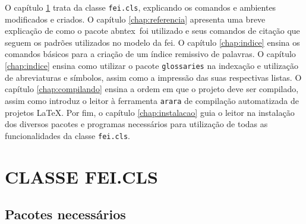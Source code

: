 \documentclass{fei}
\begin{document}
O capítulo \ref{chap:classe} trata da classe \texttt{fei.cls}, explicando os comandos e ambientes modificados e criados. O capítulo \ref{chap:referencia} apresenta uma breve explicação de como o pacote \gls{abntex}~foi utilizado e seus comandos de citação que seguem os padrões utilizados no modelo da \gls{fei}. O capítulo \ref{chap:indice} ensina os comandos básicos para a criação de um índice remissivo de palavras. O capítulo \ref{chap:indice} ensina como utilizar o pacote \texttt{glossaries} na indexação e utilização de abreviaturas e símbolos, assim como a impressão das suas respectivas listas. O capítulo \ref{chap:compilando} ensina a ordem em que o projeto deve ser compilado, assim como introduz o leitor à ferramenta \texttt{arara} de compilação automatizada de projetos \LaTeX. Por fim, o capítulo \ref{chap:instalacao} guia o leitor na instalação dos diversos pacotes e programas necessários para utilização de todas as funcionalidades da classe \texttt{fei.cls}.

\chapter{CLASSE FEI.CLS}\label{chap:classe}

\section{Pacotes necessários}\label{sec:pacotes}
    
\end{document}
